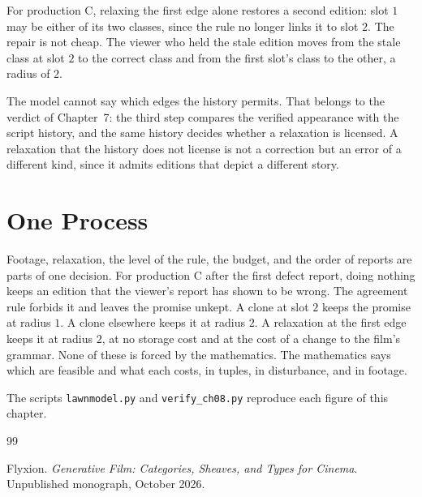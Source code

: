 \documentclass[11pt,twoside,openright]{book}
\theoremstyle{plain}
\theoremstyle{definition}
\theoremstyle{remark}
\begin{document}
For production C, relaxing the first edge alone restores a second edition: slot $1$ may be either of its two classes, since the rule no longer links it to slot $2$. The repair is not cheap. The viewer who held the stale edition moves from the stale class at slot $2$ to the correct class and from the first slot's class to the other, a radius of $2$.

The model cannot say which edges the history permits. That belongs to the verdict of Chapter~7: the third step compares the verified appearance with the script history, and the same history decides whether a relaxation is licensed. A relaxation that the history does not license is not a correction but an error of a different kind, since it admits editions that depict a different story.

\section{One Process}\label{sec:process}

Footage, relaxation, the level of the rule, the budget, and the order of reports are parts of one decision. For production C after the first defect report, doing nothing keeps an edition that the viewer's report has shown to be wrong. The agreement rule forbids it and leaves the promise unkept. A clone at slot $2$ keeps the promise at radius $1$. A clone elsewhere keeps it at radius $2$. A relaxation at the first edge keeps it at radius $2$, at no storage cost and at the cost of a change to the film's grammar. None of these is forced by the mathematics. The mathematics says which are feasible and what each costs, in tuples, in disturbance, and in footage.

The scripts \texttt{lawnmodel.py} and \texttt{verify\_ch08.py} reproduce each figure of this chapter.

\begin{thebibliography}{99}

Flyxion.
\newblock \emph{Generative Film: Categories, Sheaves, and Types for Cinema}.
\newblock Unpublished monograph, October 2026.

\end{thebibliography}
\end{document}
